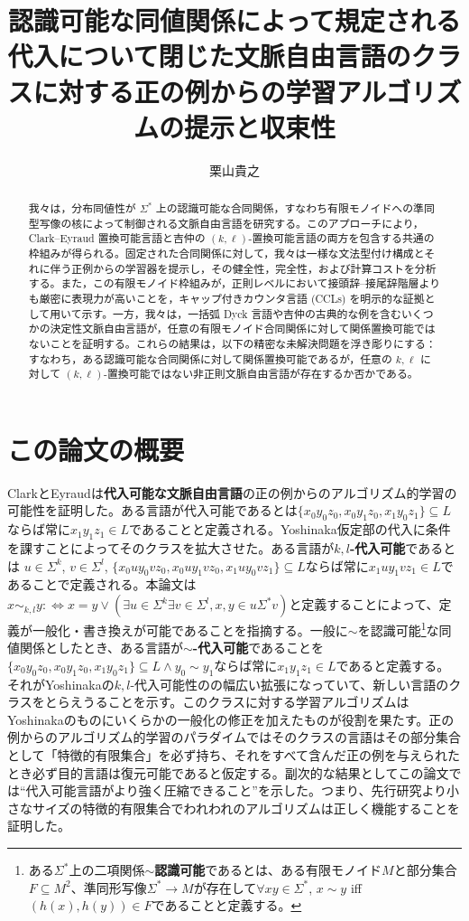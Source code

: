 \documentclass{jsbook}
\title{認識可能な同値関係によって規定される代入について閉じた文脈自由言語のクラスに対する正の例からの学習アルゴリズムの提示と収束性}
\author{栗山貴之}
\begin{document}
\sloppy

\maketitle
\tableofcontents

\begin{abstract}
我々は，分布同値性が \(\Sigma^*\) 上の認識可能な合同関係，すなわち有限モノイドへの準同型写像の核によって制御される文脈自由言語を研究する。このアプローチにより，Clark--Eyraud 置換可能言語と吉仲の \((k,\ell)\)-置換可能言語の両方を包含する共通の枠組みが得られる。固定された合同関係に対して，我々は一様な文法型付け構成とそれに伴う正例からの学習器を提示し，その健全性，完全性，および計算コストを分析する。また，この有限モノイド枠組みが，正則レベルにおいて接頭辞--接尾辞階層よりも厳密に表現力が高いことを，キャップ付きカウンタ言語 (CCLs) を明示的な証拠として用いて示す。一方，我々は，一括弧 Dyck 言語や吉仲の古典的な例を含むいくつかの決定性文脈自由言語が，任意の有限モノイド合同関係に対して関係置換可能ではないことを証明する。これらの結果は，以下の精密な未解決問題を浮き彫りにする：すなわち，ある認識可能な合同関係に対して関係置換可能であるが，任意の \(k,\ell\) に対して \((k,\ell)\)-置換可能ではない非正則文脈自由言語が存在するか否かである。
\end{abstract}


\chapter{この論文の概要}
ClarkとEyraud\cite{Clark-and-Eyraud:2007}は{\bf 代入可能な文脈自由言語}の正の例からのアルゴリズム的学習の可能性を証明した。ある言語が代入可能であるとは$\{x_0y_0z_0,x_0y_1z_0,x_1y_0z_1\}\subseteq L$ならば常に$x_1y_1z_1\in L$であることと定義される。Yoshinaka\cite{Yoshinaka:2008}仮定部の代入に条件を課すことによってそのクラスを拡大させた。ある言語が{\bf $k,l$-代入可能}であるとは $u\in\Sigma^k$, $v\in\Sigma^l$, $\{x_0uy_0vz_0,x_0uy_1vz_0,x_1uy_0vz_1\}\subseteq L$ならば常に$x_1uy_1vz_1\in L$であることで定義される。本論文は $x\sim_{k,l}y:\Leftrightarrow x=y\lor(\exists u\in\Sigma^k\exists v\in\Sigma^l, x,y\in u\Sigma^*v)$と定義することによって、定義が一般化・書き換えが可能であることを指摘する。一般に$\sim$を認識可能\footnote{ある$\Sigma^*$上の二項関係$\sim${\bf 認識可能}であるとは、ある有限モノイド$M$と部分集合$F\subseteq M^2$、準同形写像$\Sigma^*\to M$が存在して$\forall xy\in\Sigma^*$, $x\sim y$ iff $(h(x),h(y))\in F$であることと定義する。}な同値関係としたとき、ある言語が{\bf $\sim$-代入可能}であることを$\{x_0y_0z_0,x_0y_1z_0,x_1y_0z_1\}\subseteq L\land y_0\sim y_1$ならば常に$x_1y_1z_1\in L$であると定義する。それがYoshinakaの$k,l$-代入可能性のの幅広い拡張になっていて、新しい言語のクラスをとらえうることを示す。このクラスに対する学習アルゴリズムはYoshinaka\cite{Yoshinaka:2008}のものにいくらかの一般化の修正を加えたものが役割を果たす。正の例からのアルゴリズム的学習のパラダイムではそのクラスの言語はその部分集合として「特徴的有限集合」を必ず持ち、それをすべて含んだ正の例を与えられたとき必ず目的言語は復元可能であると仮定する。副次的な結果としてこの論文では``代入可能言語がより強く圧縮できること''を示した。つまり、先行研究より小さなサイズの特徴的有限集合でわれわれのアルゴリズムは正しく機能することを証明した。
\end{document}
